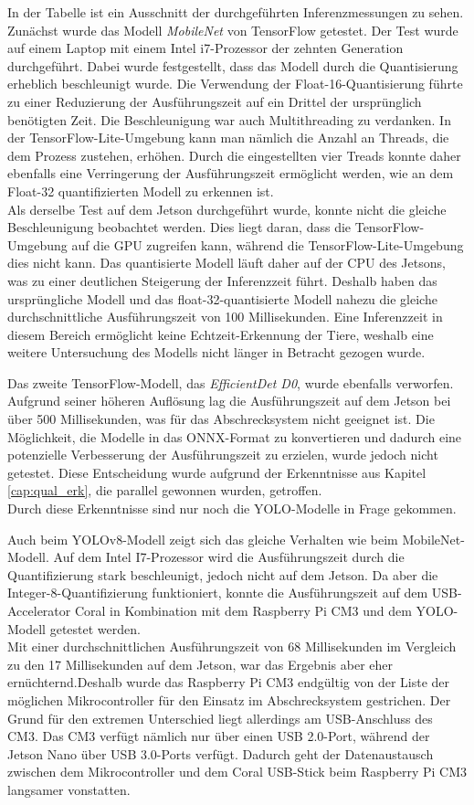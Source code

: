 In der Tabelle ist ein Ausschnitt der durchgeführten Inferenzmessungen zu sehen. Zunächst wurde das Modell \textit{MobileNet} von TensorFlow getestet. Der Test wurde auf einem Laptop mit einem Intel i7-Prozessor der zehnten Generation durchgeführt. Dabei wurde festgestellt, dass das Modell durch die Quantisierung erheblich beschleunigt wurde. Die Verwendung der Float-16-Quantisierung führte zu einer Reduzierung der Ausführungszeit auf ein Drittel der ursprünglich benötigten Zeit. Die Beschleunigung war auch Multithreading zu verdanken. In der TensorFlow-Lite-Umgebung kann man nämlich die Anzahl an Threads, die dem Prozess zustehen, erhöhen. Durch die eingestellten vier Treads konnte daher ebenfalls eine Verringerung der Ausführungszeit ermöglicht werden, wie an dem Float-32 quantifizierten Modell zu erkennen ist.
\\
Als derselbe Test auf dem Jetson durchgeführt wurde, konnte nicht die gleiche Beschleunigung beobachtet werden. Dies liegt daran, dass die TensorFlow-Umgebung auf die GPU zugreifen kann, während die TensorFlow-Lite-Umgebung dies nicht kann. Das quantisierte Modell läuft daher auf der CPU des Jetsons, was zu einer deutlichen Steigerung der Inferenzzeit führt. Deshalb haben das ursprüngliche Modell und das float-32-quantisierte Modell nahezu die gleiche durchschnittliche Ausführungszeit von 100 Millisekunden. Eine Inferenzzeit in diesem Bereich ermöglicht keine Echtzeit-Erkennung der Tiere, weshalb eine weitere Untersuchung des Modells nicht länger in Betracht gezogen wurde.

Das zweite TensorFlow-Modell, das \textit{EfficientDet D0}, wurde ebenfalls verworfen. Aufgrund seiner höheren Auflösung lag die Ausführungszeit auf dem Jetson bei über 500 Millisekunden, was für das Abschrecksystem nicht geeignet ist. Die Möglichkeit, die Modelle in das ONNX-Format zu konvertieren und dadurch eine potenzielle Verbesserung der Ausführungszeit zu erzielen, wurde jedoch nicht getestet. Diese Entscheidung wurde aufgrund der Erkenntnisse aus Kapitel \ref{cap:qual_erk}, die parallel gewonnen wurden, getroffen.
\\
Durch diese Erkenntnisse sind nur noch die \ac{YOLO}-Modelle in Frage gekommen. 

Auch beim YOLOv8-Modell zeigt sich das gleiche Verhalten wie beim MobileNet-Modell. Auf dem Intel I7-Prozessor wird die Ausführungszeit durch die Quantifizierung stark beschleunigt, jedoch nicht auf dem Jetson. Da aber die Integer-8-Quantifizierung funktioniert, konnte die Ausführungszeit auf dem USB-Accelerator Coral in Kombination mit dem Raspberry Pi CM3 und dem YOLO-Modell getestet werden.
\\
Mit einer durchschnittlichen Ausführungszeit von 68 Millisekunden im Vergleich zu den 17 Millisekunden auf dem Jetson, war das Ergebnis aber eher ernüchternd.Deshalb wurde das Raspberry Pi CM3 endgültig von der Liste der möglichen Mikrocontroller für den Einsatz im Abschrecksystem gestrichen. Der Grund für den extremen Unterschied liegt allerdings am USB-Anschluss des CM3. Das CM3 verfügt nämlich nur über einen USB 2.0-Port, während der Jetson Nano über USB 3.0-Ports verfügt. Dadurch geht der Datenaustausch zwischen dem Mikrocontroller und dem Coral USB-Stick beim Raspberry Pi CM3 langsamer vonstatten.

